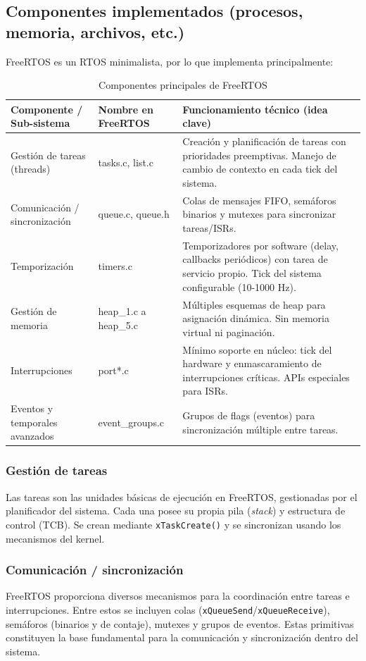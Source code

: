 \subsection{Componentes implementados (procesos, memoria, archivos, etc.)}
FreeRTOS es un RTOS minimalista, por lo que implementa principalmente:
\newpage
\begin{table}[H]
\centering
\caption{Componentes principales de FreeRTOS}
\begin{tabular}{|p{}|p{}|p{}|}
\hline
\textbf{Componente / Sub-sistema} & \textbf{Nombre en FreeRTOS} & \textbf{Funcionamiento técnico (idea clave)} \\
\hline
Gestión de tareas (threads) & tasks.c, list.c & Creación y planificación de tareas con prioridades preemptivas. Manejo de cambio de contexto en cada tick del sistema. \\
\hline
Comunicación / sincronización & queue.c, queue.h & Colas de mensajes FIFO, semáforos binarios y mutexes para sincronizar tareas/ISRs. \\
\hline
Temporización & timers.c & Temporizadores por software (delay, callbacks periódicos) con tarea de servicio propio. Tick del sistema configurable (10-1000 Hz). \\
\hline
Gestión de memoria & heap\_1.c a heap\_5.c & Múltiples esquemas de heap para asignación dinámica. Sin memoria virtual ni paginación. \\
\hline
Interrupciones & port*.c & Mínimo soporte en núcleo: tick del hardware y enmascaramiento de interrupciones críticas. APIs especiales para ISRs. \\
\hline
Eventos y temporales avanzados & event\_groups.c & Grupos de flags (eventos) para sincronización múltiple entre tareas. \\
\hline
\end{tabular}
\end{table}

\subsubsection*{Gestión de tareas}
Las tareas son las unidades básicas de ejecución en FreeRTOS, gestionadas por el planificador del sistema. Cada una posee su propia pila (\textit{stack}) y estructura de control (TCB). Se crean mediante \texttt{xTaskCreate()} y se sincronizan usando los mecanismos del kernel.\citep{freertos-book}

\subsubsection*{Comunicación / sincronización}
FreeRTOS proporciona diversos mecanismos para la coordinación entre tareas e interrupciones. Entre estos se incluyen colas (\texttt{xQueueSend}/\texttt{xQueueReceive}), semáforos (binarios y de contaje), mutexes y grupos de eventos. Estas primitivas constituyen la base fundamental para la comunicación y sincronización dentro del sistema.\citep{freertos-book}

